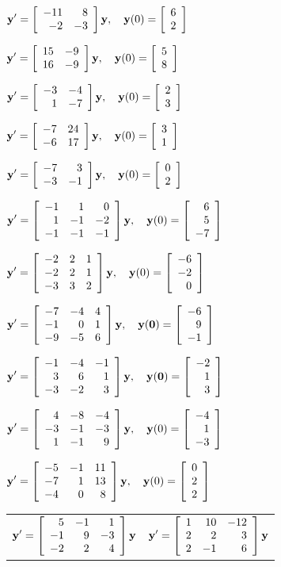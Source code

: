 \begin{exerciselist}

  \item\label{exer:10.5.13}
        $\dst{{\bf y}'=\twobytwo{-11}8{-2}{-3}{\bf y},\quad{\bf y}(0)=\twocol62}$

  \item\label{exer:10.5.14}
        $\dst{{\bf y}'=\twobytwo{15}{-9}{16}{-9}{\bf y},\quad{\bf y}(0)=\twocol58}$

  \item\label{exer:10.5.15} $\dst{{\bf y}'=\twobytwo{-3}{-4}1{-7}{\bf y},\quad{\bf y}(0)=\twocol23}$

  \item\label{exer:10.5.16}
        $\dst{{\bf y}'=\twobytwo{-7}{24}{-6}{17}{\bf y},\quad{\bf y}(0)=\twocol31}$

  \item\label{exer:10.5.17} $\dst{{\bf y}'=\twobytwo{-7}3{-3}{-1}{\bf y},\quad{\bf y}(0)=\twocol02}$

  \item\label{exer:10.5.18}
        $\dst{{\bf y}' =\threebythree{-1}101{-1}{-2}{-1}{-1}{-1}{\bf y},\quad {\bf y}(0)=\threecol65{-7}}$

  \item\label{exer:10.5.19}
        $\dst{{\bf y}' =\threebythree{-2}21{-2}21{-3}32{\bf y},\quad {\bf y}(0)=\threecol{-6}{-2}0}$

  \item\label{exer:10.5.20}
        $\dst{{\bf y}' =\threebythree{-7}{-4}4{-1}01{-9}{-5}6{\bf y},\quad\bf {\bf y}(0)=\threecol{-6}9{-1}}$

  \item\label{exer:10.5.21}
        $\dst{{\bf y}' =\threebythree{-1}{-4}{-1}361{-3}{-2}3\bf y,\quad\bf y(0)=\threecol{-2}13}$

  \item\label{exer:10.5.22}
        $\dst{{\bf y}' =\threebythree4{-8}{-4}{-3}{-1}{-3}1{-1}9{\bf y},\quad {\bf y}(0)=\threecol{-4}1{-3}}$

  \item\label{exer:10.5.23}
        $\dst{{\bf y}'= \threebythree{-5}{-1}{11}{-7}1{13}{-4}08{\bf y},\quad {\bf y}(0)=\threecol022}$


  \begin{tabular}[t]{@{}p{168pt}@{}p{168pt}}
    \item\label{exer:10.5.24} $\dst{{\bf y}' =\threebythree5{-1}1{-1}9{-3}{-2}24{\bf y}}$ &
    \item\label{exer:10.5.25} $\dst{{\bf y}' =\threebythree1{10}{-12}2232{-1}6{\bf y}}$
  \end{tabular}


\end{exerciselist}

